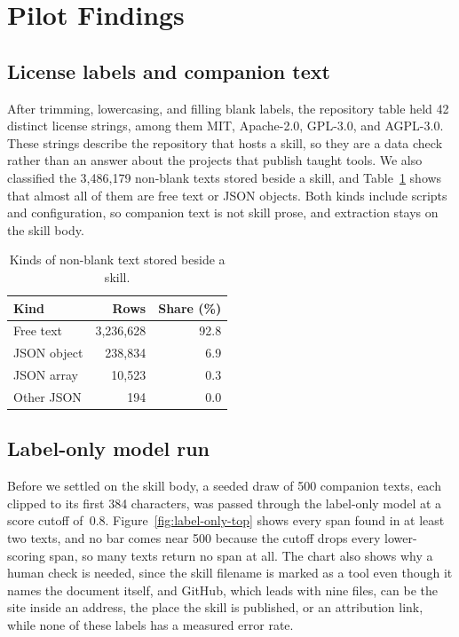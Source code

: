 \section{Pilot Findings}

\subsection{License labels and companion text}

After trimming, lowercasing, and filling blank labels, the repository table held 42 distinct license strings, among them MIT, Apache-2.0, GPL-3.0, and AGPL-3.0.
These strings describe the repository that hosts a skill, so they are a data check rather than an answer about the projects that publish taught tools.
We also classified the 3{,}486{,}179 non-blank texts stored beside a skill, and Table~\ref{tab:companion-kinds} shows that almost all of them are free text or JSON objects.
Both kinds include scripts and configuration, so companion text is not skill prose, and extraction stays on the skill body.

\begin{table}[ht]
  \centering
  \caption{Kinds of non-blank text stored beside a skill.}
  \label{tab:companion-kinds}
  \smallskip
  \begin{tabular}{lrr}
    \toprule
    Kind                    & Rows          & Share (\%) \\
    \midrule
    Free text               & 3{,}236{,}628 & 92.8       \\
    JSON object             & 238{,}834     & 6.9        \\
    JSON array              & 10{,}523      & 0.3        \\
    Other JSON\footnotemark & 194           & 0.0        \\
    \bottomrule
  \end{tabular}
\end{table}

\subsection{Label-only model run}

Before we settled on the skill body, a seeded draw of 500 companion texts, each clipped to its first 384 characters, was passed through the label-only model at a score cutoff of~$0.8$.
Figure~\ref{fig:label-only-top} shows every span found in at least two texts, and no bar comes near 500 because the cutoff drops every lower-scoring span, so many texts return no span at all.
The chart also shows why a human check is needed, since the skill filename is marked as a tool even though it names the document itself, and GitHub, which leads with nine files, can be the site inside an address, the place the skill is published, or an attribution link, while none of these labels has a measured error rate.

